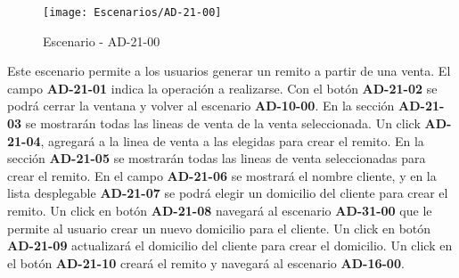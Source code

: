 \begin{figure}[H]
\centering
\texttt{[image: Escenarios/AD-21-00]}
\caption{Escenario - AD-21-00}
\label{fig:AD-21-00}
\end{figure}
Este escenario permite a los usuarios generar un remito a partir de una venta. El campo \textbf{AD-21-01} indica la operación a realizarse. Con el botón \textbf{AD-21-02} se podrá cerrar la ventana y volver al escenario \textbf{AD-10-00}. 
En la sección \textbf{AD-21-03} se mostrarán todas las lineas de venta de la venta seleccionada. Un click \textbf{AD-21-04}, agregará a la linea de venta a las elegidas para crear el remito. En la sección \textbf{AD-21-05} se mostrarán todas las lineas de venta seleccionadas para crear el remito.
En el campo \textbf{AD-21-06} se mostrará el nombre cliente, y en la lista desplegable \textbf{AD-21-07} se podrá elegir un domicilio del cliente para crear el remito. Un click en botón \textbf{AD-21-08} navegará al escenario \textbf{AD-31-00} que le permite al usuario crear un nuevo domicilio para el cliente. Un click en botón \textbf{AD-21-09} actualizará el domicilio del cliente para crear el domicilio.
Un click en el botón \textbf{AD-21-10} creará el remito y navegará al escenario \textbf{AD-16-00}.
\clearpage
